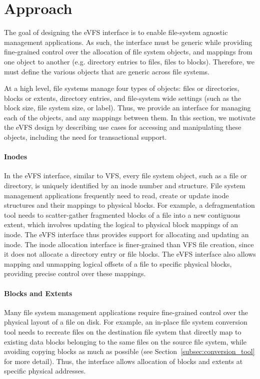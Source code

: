 \vspace{-0.7em}
\section{Approach\label{sec:Approach}}
\vspace{-0.4em}

The goal of designing the eVFS interface is to enable file-system agnostic management applications. As such, the interface must be generic while providing fine-grained control over the allocation of file system objects, and mappings from one object to another (e.g. directory entries to files, files to blocks). Therefore, we must define the various objects that are generic across file systems.

At a high level, file systems manage four types of objects: files or directories, blocks or extents, directory entries, and file-system wide settings (such as the block size, file system size, or label). Thus, we provide an interface for managing each of the objects, and any mappings between them. In this section, we motivate the eVFS design by describing use cases for accessing and manipulating these objects, including the need for transactional support.

\vspace{-0.25em}
\paragraph{Inodes} In the eVFS interface, similar to VFS, every file system object, such as a file or directory, is uniquely identified by an inode number and structure. File system management applications frequently need to read, create or update inode structures and their mappings to physical blocks. For example, a defragmentation tool needs to scatter-gather fragmented blocks of a file into a new contiguous extent, which involves updating the logical to physical block mappings of an inode. The eVFS interface thus provides support for allocating and updating an inode. The inode allocation interface is finer-grained than VFS file creation, since it does not allocate a directory entry or file blocks. The eVFS interface also allows mapping and unmapping logical offsets of a file to specific physical blocks, providing precise control over these mappings.

\vspace{-0.25em}
\paragraph{Blocks and Extents} Many file system management applications require fine-grained control over the physical layout of a file on disk. For example, an in-place file system conversion tool needs to recreate files on the destination file system that directly map to existing data blocks belonging to the same files on the source file system, while avoiding copying blocks as much as possible (see Section~\ref{subsec:conversion_tool} for more detail). Thus, the interface allows allocation of blocks and extents at specific physical addresses.

